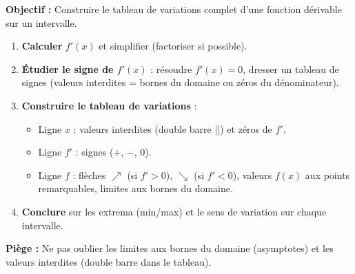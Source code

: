 \documentclass[11pt]{article}
\begin{document}
\begin{methode}
\textbf{Objectif :} Construire le tableau de variations complet d'une fonction dérivable sur un intervalle.
\begin{enumerate}
    \item \textbf{Calculer} $f'(x)$ et simplifier (factoriser si possible).
    \item \textbf{Étudier le signe de $f'(x)$} : résoudre $f'(x)=0$, dresser un tableau de signes (valeurs interdites = bornes du domaine ou zéros du dénominateur).
    \item \textbf{Construire le tableau de variations} :
        \begin{itemize}
            \item Ligne $x$ : valeurs interdites (double barre ||) et zéros de $f'$.
            \item Ligne $f'$ : signes ($+$, $-$, $0$).
            \item Ligne $f$ : flèches $\nearrow$ (si $f'>0$), $\searrow$ (si $f'<0$), valeurs $f(x)$ aux points remarquables, limites aux bornes du domaine.
        \end{itemize}
    \item \textbf{Conclure} sur les extrema (min/max) et le sens de variation sur chaque intervalle.
\end{enumerate}
\textbf{Piège :} Ne pas oublier les limites aux bornes du domaine (asymptotes) et les valeurs interdites (double barre dans le tableau).
\end{methode}
\end{document}
